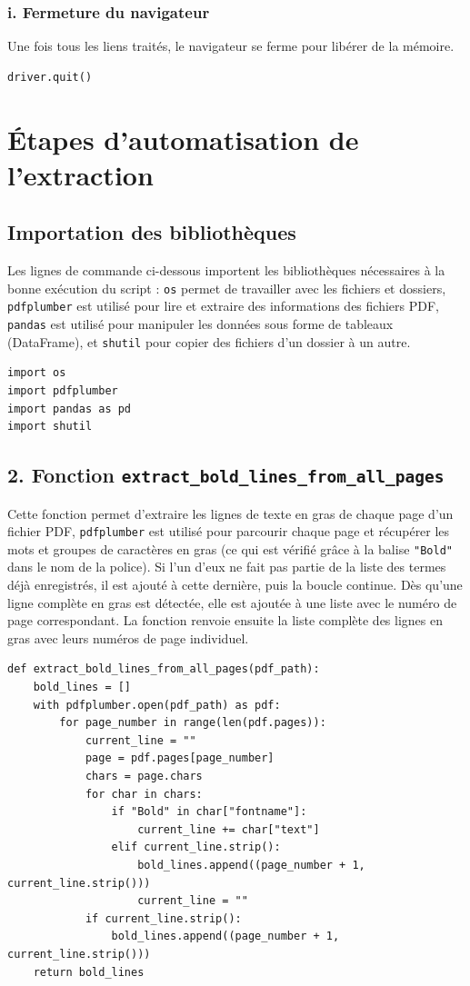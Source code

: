 \subsubsection{i. Fermeture du navigateur}

Une fois tous les liens traités, le navigateur se ferme pour libérer de la mémoire.

\begin{lstlisting}[language=Python]
driver.quit()
\end{lstlisting}

\section{Étapes d'automatisation de l'extraction}

\subsection{Importation des bibliothèques}

Les lignes de commande ci-dessous importent les bibliothèques nécessaires à la bonne exécution du script : \texttt{os} permet de travailler avec les fichiers et dossiers, \texttt{pdfplumber} est utilisé pour lire et extraire des informations des fichiers PDF, \texttt{pandas} est utilisé pour manipuler les données sous forme de tableaux (DataFrame), et \texttt{shutil} pour copier des fichiers d'un dossier à un autre.

\begin{lstlisting}
import os
import pdfplumber
import pandas as pd
import shutil
\end{lstlisting}
\subsection{2. Fonction \texttt{extract\_bold\_lines\_from\_all\_pages}}
Cette fonction permet d'extraire les lignes de texte en gras de chaque page d'un fichier PDF, \texttt{pdfplumber} est utilisé pour parcourir chaque page et récupérer les mots et groupes de caractères en gras (ce qui est vérifié grâce à la balise \texttt{"Bold"} dans le nom de la police). Si l'un d'eux ne fait pas partie de la liste des termes déjà enregistrés, il est ajouté à cette dernière, puis la boucle continue. 
Dès qu'une ligne complète en gras est détectée, elle est ajoutée à une liste avec le numéro de page correspondant. La fonction renvoie ensuite la liste complète des lignes en gras avec leurs numéros de page individuel.
\begin{lstlisting}
def extract_bold_lines_from_all_pages(pdf_path):
    bold_lines = []
    with pdfplumber.open(pdf_path) as pdf:
        for page_number in range(len(pdf.pages)):
            current_line = ""
            page = pdf.pages[page_number]
            chars = page.chars
            for char in chars:
                if "Bold" in char["fontname"]:
                    current_line += char["text"]
                elif current_line.strip():
                    bold_lines.append((page_number + 1, current_line.strip()))  
                    current_line = ""
            if current_line.strip():
                bold_lines.append((page_number + 1, current_line.strip()))  
    return bold_lines
\end{lstlisting}
\newpage
